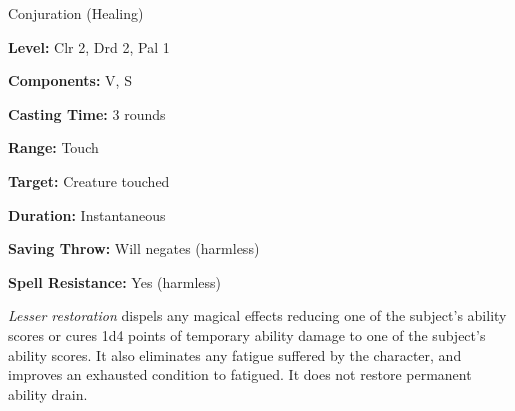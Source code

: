 \label{spell:Lesser Restoration}

Conjuration (Healing)

\textbf{Level:} Clr 2, Drd 2, Pal 1

\textbf{Components:} V, S

\textbf{Casting Time:} 3 rounds

\textbf{Range:} Touch

\textbf{Target:} Creature touched

\textbf{Duration:} Instantaneous

\textbf{Saving Throw:} Will negates (harmless)

\textbf{Spell Resistance:} Yes (harmless)

\textit{Lesser restoration} dispels any magical effects reducing one of the subject's 
ability scores or cures 1d4 points of temporary ability damage to one of the subject's 
ability scores. It also eliminates any fatigue suffered by the character, and improves 
an exhausted condition to fatigued. It does not restore permanent ability drain.

